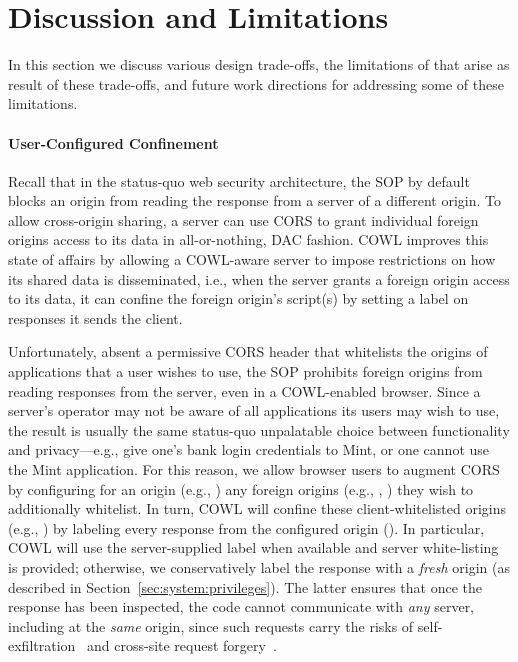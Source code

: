 \section{Discussion and Limitations}
\label{sec:discussion}

In this section we discuss various design trade-offs, the limitations
of \sys{} that arise as result of these trade-offs, and future work
directions for addressing some of these limitations.

\paragraph{User-Configured Confinement}
Recall that in the status-quo web security architecture, the SOP by
default blocks an origin from reading the response from a server of a
different origin. To allow cross-origin sharing, a server can use CORS
to grant individual foreign origins access to its data in
all-or-nothing, DAC fashion.
%
COWL improves this state of affairs
by allowing a COWL-aware server to impose restrictions on how its
shared data is disseminated, i.e., when the server
grants a foreign origin access to its data, it can confine the foreign
origin's script(s) by setting a label on responses it sends the
client.

Unfortunately, absent a permissive CORS header that whitelists the
origins of applications that a user wishes to use, the SOP
prohibits foreign origins from reading responses from the server,
even in a COWL-enabled browser.
%
Since a server's operator may not be aware of all applications its
users may wish to use, the result is usually the same status-quo
unpalatable choice between functionality and privacy---e.g., give
one's bank login credentials to Mint, or one cannot use the Mint
application.
%
For this reason, we allow browser users to augment CORS
by configuring for an origin (e.g., ) any foreign
origins (e.g., , ) they wish to
additionally whitelist.
%
In turn, COWL will confine these client-whitelisted origins (e.g.,
) by labeling every response from the configured
origin ().
%
In particular, COWL will use the server-supplied label when available
and server white-listing is provided; 
otherwise, we conservatively label the response with a
\emph{fresh} origin (as described in
Section~\ref{sec:system:privileges}). The latter ensures that once the
response has been inspected, the code cannot communicate with
\emph{any} server, including at the \emph{same} origin, since such
requests carry the risks of self-exfiltration~\cite{selfex} and
cross-site request forgery~\cite{CSRF}.
%


